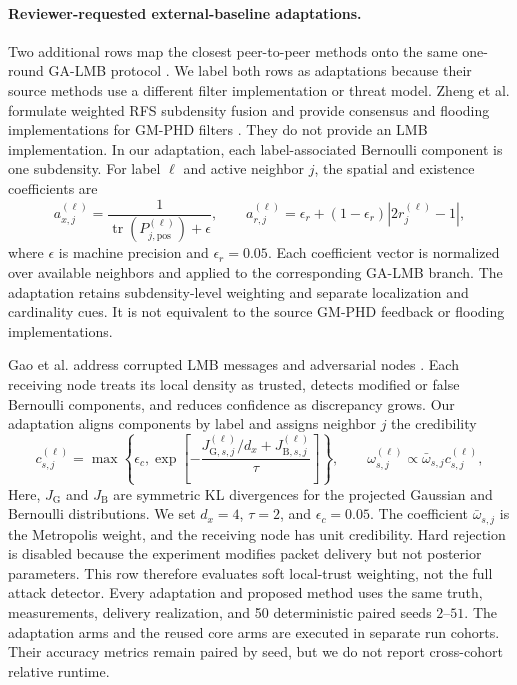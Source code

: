 \paragraph{Reviewer-requested external-baseline adaptations.}
Two additional rows map the closest peer-to-peer methods onto the same one-round GA-LMB protocol \cite{Zheng2026DistributedWeightedRFS,Gao2023ResilientLMB}. We label both rows as adaptations because their source methods use a different filter implementation or threat model. Zheng et al. formulate weighted RFS subdensity fusion and provide consensus and flooding implementations for GM-PHD filters \cite{Zheng2026DistributedWeightedRFS}. They do not provide an LMB implementation. In our adaptation, each label-associated Bernoulli component is one subdensity. For label $\ell$ and active neighbor $j$, the spatial and existence coefficients are
\begin{equation}
 a_{x,j}^{(\ell)}=\frac{1}{\operatorname{tr}(P_{j,\mathrm{pos}}^{(\ell)})+\epsilon},
 \qquad
 a_{r,j}^{(\ell)}=\epsilon_r+(1-\epsilon_r)\left|2r_j^{(\ell)}-1\right|,
 \label{eq:zheng-style-adaptation}
\end{equation}
where $\epsilon$ is machine precision and $\epsilon_r=0.05$. Each coefficient vector is normalized over available neighbors and applied to the corresponding GA-LMB branch. The adaptation retains subdensity-level weighting and separate localization and cardinality cues. It is not equivalent to the source GM-PHD feedback or flooding implementations.

Gao et al. address corrupted LMB messages and adversarial nodes \cite{Gao2023ResilientLMB}. Each receiving node treats its local density as trusted, detects modified or false Bernoulli components, and reduces confidence as discrepancy grows. Our adaptation aligns components by label and assigns neighbor $j$ the credibility
\begin{equation}
 c_{s,j}^{(\ell)}=\max\!\left\{\epsilon_c,
 \exp\!\left[-\frac{J_{\mathrm{G},s,j}^{(\ell)}/d_x+J_{\mathrm{B},s,j}^{(\ell)}}{\tau}\right]\right\},
 \qquad
 \omega_{s,j}^{(\ell)}\propto \bar{\omega}_{s,j}c_{s,j}^{(\ell)},
 \label{eq:gao-style-adaptation}
\end{equation}
Here, $J_{\mathrm{G}}$ and $J_{\mathrm{B}}$ are symmetric KL divergences for the projected Gaussian and Bernoulli distributions. We set $d_x=4$, $\tau=2$, and $\epsilon_c=0.05$. The coefficient $\bar{\omega}_{s,j}$ is the Metropolis weight, and the receiving node has unit credibility. Hard rejection is disabled because the experiment modifies packet delivery but not posterior parameters. This row therefore evaluates soft local-trust weighting, not the full attack detector. Every adaptation and proposed method uses the same truth, measurements, delivery realization, and 50 deterministic paired seeds $2$--$51$. The adaptation arms and the reused core arms are executed in separate run cohorts. Their accuracy metrics remain paired by seed, but we do not report cross-cohort relative runtime.

